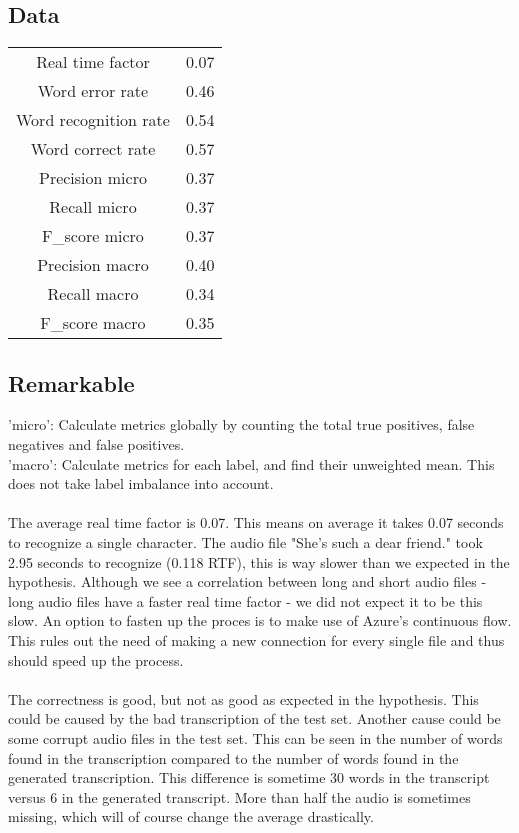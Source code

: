 \documentclass{article}
\begin{document}
\subsection{Data}

\begin{center}
\begin{tabular}{ |c|c| } 
 \hline
 Real time factor & 0.07 \\ 
 Word error rate & 0.46 \\ 
 Word recognition rate & 0.54 \\ 
 Word correct rate & 0.57 \\ 
 Precision micro & 0.37 \\ 
 Recall micro & 0.37 \\ 
 F\_score micro & 0.37 \\  
 Precision macro & 0.40 \\  
 Recall macro & 0.34 \\  
 F\_score macro & 0.35 \\   
 \hline
\end{tabular}
\end{center}

\subsection{Remarkable}
    'micro': Calculate metrics globally by counting the total true positives, false negatives and false positives. \\
    'macro': Calculate metrics for each label, and find their unweighted mean. This does not take label imbalance into account. \\ \\
    The average real time factor is 0.07. This means on average it takes 0.07 seconds to recognize a single character. The audio file "She's such a dear friend." took 2.95 seconds to recognize (0.118 RTF), this is way slower than we expected in the hypothesis. Although we see a correlation between long and short audio files - long audio files have a faster real time factor - we did not expect it to be this slow. An option to fasten up the proces is to make use of Azure's continuous flow. This rules out the need of making a new connection for every single file and thus should speed up the process. \\ \\
    The correctness is good, but not as good as expected in the hypothesis. This could be caused by the bad transcription of the test set. 
    Another cause could be some corrupt audio files in the test set. This can be seen in the number of words found in the transcription compared to the number of words found in the generated transcription. This difference is sometime 30 words in the transcript versus 6 in the generated transcript. More than half the audio is sometimes missing, which will of course change the average drastically. 
    
\end{document}
